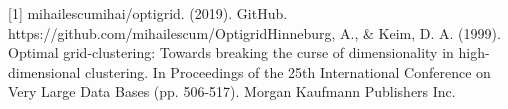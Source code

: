 [1] mihailescumihai/optigrid. (2019). GitHub. https://github.com/mihailescum/Optigrid\newline
[2] Hinneburg, A., \& Keim, D. A. (1999). Optimal grid-clustering: Towards breaking the curse of dimensionality in high-dimensional clustering. In Proceedings of the 25th International Conference on Very Large Data Bases (pp. 506-517). Morgan Kaufmann Publishers Inc.